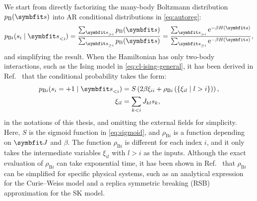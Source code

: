 We start from directly factorizing the many-body Boltzmann distribution $p_\text{B}(\vs)$ into AR conditional distributions in \cref{eq:autoreg}:
\begin{equation}
p_{\text{B} i}(s_i \mid \vs_{< i})
= \frac{\sum_{\vs_{> i}} p_\text{B}(\vs)}{\sum_{\vs_{\ge i}} p_\text{B}(\vs)}
= \frac{\sum_{\vs_{> i}} \rme^{-\beta H(\vs)}}{\sum_{\vs_{\ge i}} \rme^{-\beta H(\vs)}},
\end{equation}
and simplifying the result. When the Hamiltonian has only two-body interactions, such as the Ising model in \cref{eq:cl-ising-general}, it has been derived in Ref.~\cite{biazzo2024sparse} that the conditional probability takes the form:
\begin{align}
p_{\text{B} i}(s_i = +1 \mid \vs_{<i}) &= S\left( 2 \beta \xi_{i i} + \rho_{\text{B} i}\left( \{\xi_{i l} \mid l > i\} \right) \right), \label{eq:twobo} \\
\xi_{i l} &= \sum_{k < i} J_{k l} s_k, \label{eq:twobo-xi}
\end{align}
in the notations of this thesis, and omitting the external fields for simplicity. Here, $S$ is the sigmoid function in \cref{eq:sigmoid}, and $\rho_{\text{B} i}$ is a function depending on $\mJ$ and $\beta$. The function $\rho_{\text{B} i}$ is different for each index $i$, and it only takes the intermediate variables $\xi_{i l}$ with $l > i$ as the inputs. Although the exact evaluation of $\rho_{\text{B} i}$ can take exponential time, it has been shown in Ref.~\cite{biazzo2023autoregressive} that $\rho_{\text{B} i}$ can be simplified for specific physical systems, such as an analytical expression for the Curie--Weiss model and a replica symmetric breaking (RSB) approximation for the SK model.

